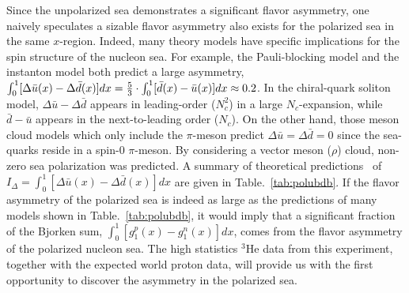  Since the unpolarized sea demonstrates a significant flavor asymmetry, 
 one naively speculates a sizable flavor asymmetry also exists for 
 the polarized sea in the same $x$-region.
 Indeed, many theory models have specific 
 implications for the spin structure of the nucleon sea. 
For example, the Pauli-blocking model and 
 the instanton model both predict a large asymmetry, 
 $\int_0^1 [\Delta \bar{u}(x)-\Delta \bar{d}(x)]dx={5 \over 3} \cdot \int_0^1 [\bar{d}(x)-\bar{u}(x)]dx \approx 0.2$.
 In the chiral-quark soliton model, $\Delta \bar{u}-\Delta \bar{d}$ appears in leading-order ($N_c^2$) in a large 
$N_c$-expansion, while $\bar{d}-\bar{u}$ appears in the next-to-leading order ($N_c$). 
 On the other hand, those meson cloud models which only include the $\pi$-meson 
predict $\Delta \bar{u}=\Delta \bar{d}=0$ 
 since the sea-quarks reside in a spin-0 $\pi$-meson. By considering a vector meson ($\rho$) cloud, non-zero sea 
 polarization 
 was predicted.
A summary of theoretical
predictions~\cite{jcpengpol} of $I_\Delta = \int_0^1 [\Delta \bar{u}(x)-\Delta \bar{d}(x)]dx$ are given in Table.~\ref{tab:polubdb}. If the
 flavor asymmetry of the polarized sea is indeed as large as the predictions of many models 
shown in Table.~\ref{tab:polubdb}, it would imply that a significant fraction of the Bjorken
sum, $\int_0^1[g_1^p(x)-g_1^n(x)]dx$, comes from the flavor asymmetry of the polarized nucleon sea.
The high statistics $^3$He data from this experiment, together with the expected world proton data, 
will provide us with the first opportunity to discover the asymmetry in the polarized sea.
